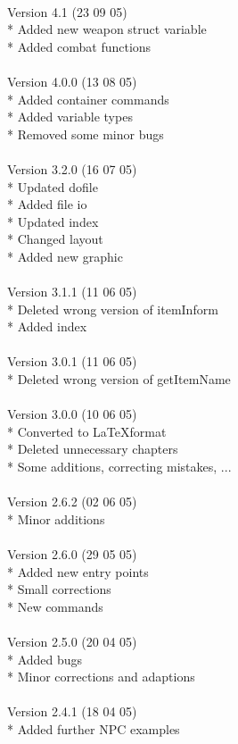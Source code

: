 \documentclass[a4paper,10pt,makeidx]{scrreprt}
\begin{document}
\\
Version 4.1 (23 09 05)\\
* Added new weapon struct variable\\
* Added combat functions\\
\\
Version 4.0.0 (13 08 05)\\
* Added container commands\\
* Added variable types\\
* Removed some minor bugs\\
\\
Version 3.2.0 (16 07 05)\\
* Updated dofile\\
* Added file io\\
* Updated index\\
* Changed layout\\
* Added new graphic\\
\\
Version 3.1.1 (11 06 05)\\
* Deleted wrong version of itemInform\\
* Added index\\
\\
Version 3.0.1 (11 06 05)\\
* Deleted wrong version of getItemName\\
\\
Version 3.0.0 (10 06 05)\\
* Converted to \LaTeX format\\
* Deleted unnecessary chapters\\
* Some additions, correcting mistakes, ...\\
\\
Version 2.6.2 (02 06 05)\\
* Minor additions\\
\\
Version 2.6.0 (29 05 05)\\
* Added new entry points\\
* Small corrections\\
* New commands\\
\\
Version 2.5.0 (20 04 05)\\
* Added bugs\\
* Minor corrections and adaptions\\
\\
Version 2.4.1 (18 04 05)\\
* Added further NPC examples\\
\end{document}
